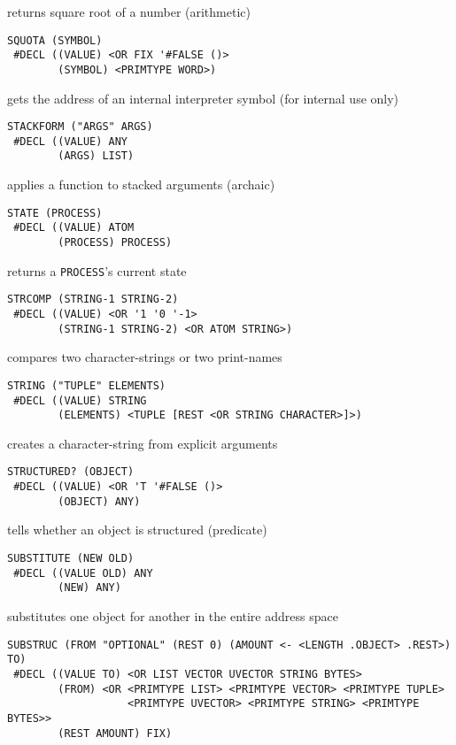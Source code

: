 \documentclass[a4paper]{scrbook}
\begin{document}
returns square root of a number (arithmetic)

\begin{verbatim}
SQUOTA (SYMBOL)
 #DECL ((VALUE) <OR FIX '#FALSE ()>
        (SYMBOL) <PRIMTYPE WORD>)
\end{verbatim}

 gets the address of an internal interpreter symbol (for internal use only)

\begin{verbatim}
STACKFORM ("ARGS" ARGS)
 #DECL ((VALUE) ANY
        (ARGS) LIST)
\end{verbatim}

applies a function to stacked arguments (archaic)

\begin{verbatim}
STATE (PROCESS)
 #DECL ((VALUE) ATOM
        (PROCESS) PROCESS)
\end{verbatim}

returns a \texttt{PROCESS}'s current state

\begin{verbatim}
STRCOMP (STRING-1 STRING-2)
 #DECL ((VALUE) <OR '1 '0 '-1>
        (STRING-1 STRING-2) <OR ATOM STRING>)
\end{verbatim}

compares two character-strings or two print-names

\begin{verbatim}
STRING ("TUPLE" ELEMENTS)
 #DECL ((VALUE) STRING
        (ELEMENTS) <TUPLE [REST <OR STRING CHARACTER>]>)
\end{verbatim}

creates a character-string from explicit arguments

\begin{verbatim}
STRUCTURED? (OBJECT)
 #DECL ((VALUE) <OR 'T '#FALSE ()>
        (OBJECT) ANY)
\end{verbatim}

tells whether an object is structured (predicate)

\begin{verbatim}
SUBSTITUTE (NEW OLD)
 #DECL ((VALUE OLD) ANY
        (NEW) ANY)
\end{verbatim}

substitutes one object for another in the entire address space

\begin{verbatim}
SUBSTRUC (FROM "OPTIONAL" (REST 0) (AMOUNT <- <LENGTH .OBJECT> .REST>) TO)
 #DECL ((VALUE TO) <OR LIST VECTOR UVECTOR STRING BYTES>
        (FROM) <OR <PRIMTYPE LIST> <PRIMTYPE VECTOR> <PRIMTYPE TUPLE>
                   <PRIMTYPE UVECTOR> <PRIMTYPE STRING> <PRIMTYPE BYTES>>
        (REST AMOUNT) FIX)
\end{verbatim}
\end{document}
